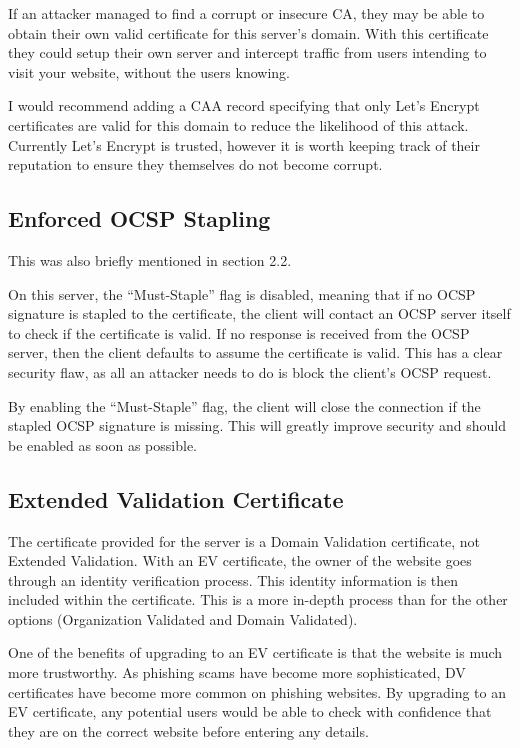 \documentclass[12pt]{article}
\begin{document}
  If an attacker managed to find a corrupt or insecure CA, they may be able to obtain their own valid certificate for this server's domain.
  With this certificate they could setup their own server and intercept traffic from users intending to visit your website, without the users knowing.

  I would recommend adding a CAA record specifying that only Let's Encrypt certificates are valid for this domain to reduce the likelihood of this attack.
  Currently Let's Encrypt is trusted, however it is worth keeping track of their reputation to ensure they themselves do not become corrupt.


  \subsection{Enforced OCSP Stapling}
  This was also briefly mentioned in section 2.2.
  
  On this server, the ``Must-Staple'' flag is disabled, meaning that if no OCSP signature is stapled to the certificate, the client will contact an OCSP server itself to check if the certificate is valid.
  If no response is received from the OCSP server, then the client defaults to assume the certificate is valid.
  This has a clear security flaw, as all an attacker needs to do is block the client's OCSP request.

  By enabling the ``Must-Staple'' flag, the client will close the connection if the stapled OCSP signature is missing.
  This will greatly improve security and should be enabled as soon as possible.


  \subsection{Extended Validation Certificate}
  The certificate provided for the server is a Domain Validation certificate, not Extended Validation.
  With an EV certificate, the owner of the website goes through an identity verification process.
  This identity information is then included within the certificate.
  This is a more in-depth process than for the other options (Organization Validated and Domain Validated).

  One of the benefits of upgrading to an EV certificate is that the website is much more trustworthy.
  As phishing scams have become more sophisticated, DV certificates have become more common on phishing websites.
  By upgrading to an EV certificate, any potential users would be able to check with confidence that they are on the correct website before entering any details.
\end{document}
